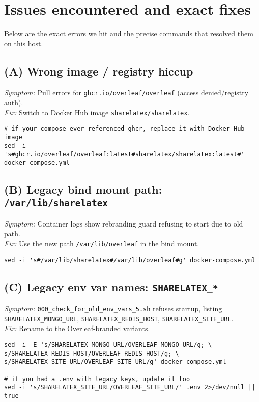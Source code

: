 \section{Issues encountered and exact fixes}
Below are the exact errors we hit and the precise commands that resolved them on this host.

\subsection{(A) Wrong image / registry hiccup}
\textit{Symptom:} Pull errors for \texttt{ghcr.io/overleaf/overleaf} (access denied/registry auth).\\
\textit{Fix:} Switch to Docker Hub image \texttt{sharelatex/sharelatex}.
\begin{verbatim}
# if your compose ever referenced ghcr, replace it with Docker Hub image
sed -i 's#ghcr.io/overleaf/overleaf:latest#sharelatex/sharelatex:latest#' docker-compose.yml
\end{verbatim}

\subsection{(B) Legacy bind mount path: \texttt{/var/lib/sharelatex}}
\textit{Symptom:} Container logs show rebranding guard refusing to start due to old path.\\
\textit{Fix:} Use the new path \texttt{/var/lib/overleaf} in the bind mount.
\begin{verbatim}
sed -i 's#/var/lib/sharelatex#/var/lib/overleaf#g' docker-compose.yml
\end{verbatim}

\subsection{(C) Legacy env var names: \texttt{SHARELATEX\_*}}
\textit{Symptom:} \texttt{000\_check\_for\_old\_env\_vars\_5.sh} refuses startup, listing \texttt{SHARELATEX\_MONGO\_URL}, \texttt{SHARELATEX\_REDIS\_HOST}, \texttt{SHARELATEX\_SITE\_URL}.\\
\textit{Fix:} Rename to the Overleaf-branded variants.
\begin{verbatim}
sed -i -E 's/SHARELATEX_MONGO_URL/OVERLEAF_MONGO_URL/g; \
s/SHARELATEX_REDIS_HOST/OVERLEAF_REDIS_HOST/g; \
s/SHARELATEX_SITE_URL/OVERLEAF_SITE_URL/g' docker-compose.yml

# if you had a .env with legacy keys, update it too
sed -i 's/SHARELATEX_SITE_URL/OVERLEAF_SITE_URL/' .env 2>/dev/null || true
\end{verbatim}

